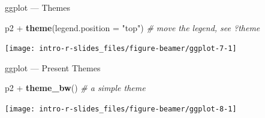 \documentclass[10pt,ignorenonframetext,compress, aspectratio=169]{beamer}
\newenvironment{Shaded}{\begin{snugshade}}{\end{snugshade}}
\newcommand{\KeywordTok}[1]{\textcolor[rgb]{0.13,0.29,0.53}{\textbf{{#1}}}}
\newcommand{\DataTypeTok}[1]{\textcolor[rgb]{0.13,0.29,0.53}{{#1}}}
\newcommand{\StringTok}[1]{\textcolor[rgb]{0.31,0.60,0.02}{{#1}}}
\newcommand{\CommentTok}[1]{\textcolor[rgb]{0.56,0.35,0.01}{\textit{{#1}}}}
\newcommand{\NormalTok}[1]{{#1}}
\begin{document}
\begin{frame}[fragile]{ggplot --- Themes}

\scriptsize

\begin{Shaded}
\begin{Highlighting}[]
\NormalTok{p2 +}\StringTok{ }\KeywordTok{theme}\NormalTok{(}\DataTypeTok{legend.position =} \StringTok{"top"}\NormalTok{)     }\CommentTok{# move the legend, see ?theme}
\end{Highlighting}
\end{Shaded}

\begin{center}\texttt{[image: intro-r-slides\_files/figure-beamer/ggplot-7-1]} \end{center}

\normalsize

\end{frame}

\begin{frame}[fragile]{ggplot --- Present Themes}

\scriptsize

\begin{Shaded}
\begin{Highlighting}[]
\NormalTok{p2 +}\StringTok{ }\KeywordTok{theme_bw}\NormalTok{()                         }\CommentTok{# a simple theme}
\end{Highlighting}
\end{Shaded}

\begin{center}\texttt{[image: intro-r-slides\_files/figure-beamer/ggplot-8-1]} \end{center}

\normalsize

\end{frame}
\end{document}
